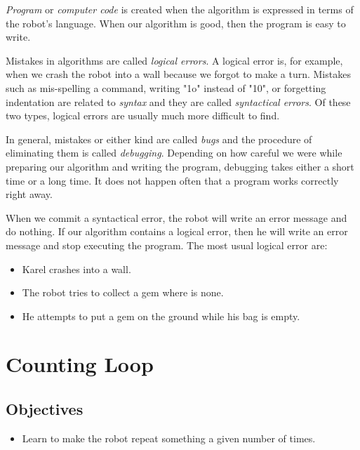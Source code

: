 {\em Program} or {\em computer code} is created when the algorithm is expressed
in terms of the robot's language. When our algorithm is good, then 
the program is easy to write.

Mistakes in algorithms are called {\em logical errors}. A logical error is, for 
example, when we crash the robot into a wall because we forgot to make a turn.
Mistakes such as mis-spelling a command, writing "1o" instead of "10", or forgetting 
indentation are related to 
{\em syntax} and they are called {\em syntactical errors}. Of these two types, 
logical errors are usually much more difficult to find. 

In general, mistakes or either kind are called {\em bugs} and the procedure of 
eliminating them is called {\em debugging}. Depending on how careful we 
were while preparing our algorithm and writing the program, debugging takes either 
a short time or a long time. It does not happen often that a program works correctly
right away. 

When we commit a syntactical error,
the robot will write an error message and do nothing.
If our algorithm contains a logical error, then he will
write an error message and stop executing the program. 
The most usual logical error are:

\begin{itemize}
\item Karel crashes into a wall.
\item The robot tries to collect a gem where is none.
\item He attempts to put a gem on the ground while his bag is empty.
\end{itemize}


\section{Counting Loop} \label{sec:repeat}

\subsection{Objectives} 

\begin{itemize}
\item Learn to make the robot repeat something a given number of times.
\end{itemize}

